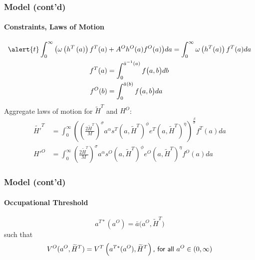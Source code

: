 \documentclass[11pt]{beamer}
\begin{document}
\begin{frame}
\frametitle{Model (cont'd)}
\framesubtitle{Constraints, Laws of Motion}
\begin{align}
\alert{t}  \int_0^\infty \big( \omega\left(h^{T}\left( a \right) \right) {f}^T(a) & + A^O h^O(a) f^O(a) \big) da  = \int_0^\infty \omega\left(h^{T}(a)\right) {f}^T(a) da \nonumber\\%
f^T(a) & = \int_0^{\bar{a}^{-1}\left(a\right)} f\big(a,b \big) db \nonumber\\
f^O(b) & = \int_0^{\bar{a}\left(b\right)} f\big(a,b \big) da \nonumber
\end{align}
Aggregate laws of motion for $\widetilde{H}^T$ and ${H}^O$:
\begin{align}
\widetilde{H'}^{T} & = \int_0^\infty \left(\left(\tfrac{2 \widetilde{H}^T}{M}\right)^\sigma a^\alpha s^T\left(a,\widetilde{H}^T\right)^\phi e^T(a,\widetilde{H}^T)^\eta \right)^{\frac{\beta}{\sigma}} f^T(a) da \nonumber \\
{H'}^{O} & = \int_0^\infty \left(\tfrac{2 \widetilde{H}^T}{M}\right)^\sigma a^\alpha s^O\left(a,\widetilde{H}^T\right)^\phi e^O(a,\widetilde{H}^T)^\eta  f^O(a) da \nonumber
\end{align}
\end{frame}

\begin{frame}
\frametitle{Model (cont'd)}
\framesubtitle{Occupational Threshold}
\begin{equation*}
a^{T*}(a^O) = \bar{a}\big(a^{O},\widetilde{H}^T\big) %
\end{equation*}
such that
\begin{equation*}
V^{O}(a^{O},\widetilde{H}^T) = V^{T}\left(a^{T*}(a^O),\widetilde{H}^T\right) \textrm{{\sf , for all} } a^O \in (0,\infty)
\end{equation*}

\end{frame}
\end{document}

